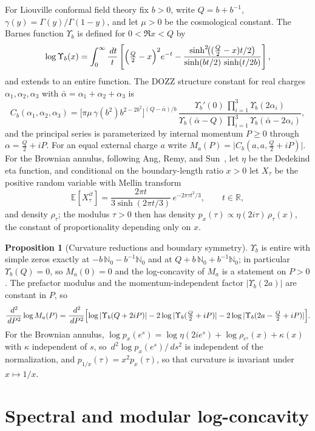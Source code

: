 \documentclass[11pt]{article}
\theoremstyle{definition}
\newcommand{\E}{\mathbb E}
\newcommand{\R}{\mathbb R}
\newcommand{\dd}{\,d}
\providecommand{\R}{\mathbb R}
\providecommand{\E}{\mathbb E}
\newtheorem{proposition}{Proposition}
\begin{document}
For Liouville conformal field theory fix $b>0$, write $Q=b+b^{-1}$, $\gamma(y)=\Gamma(y)/\Gamma(1-y)$, and let $\mu>0$ be the cosmological constant.  The Barnes function $\Upsilon_b$ is defined for $0<\Re x<Q$ by
\[
\log\Upsilon_b(x)=\int_0^\infty\frac{\dd t}{t}\left[\Bigl(\tfrac Q2-x\Bigr)^2e^{-t}-\frac{\sinh^2\!\bigl((\tfrac Q2-x)t/2\bigr)}{\sinh(bt/2)\,\sinh(t/2b)}\right],
\]
and extends to an entire function.  The DOZZ structure constant for real charges $\alpha_1,\alpha_2,\alpha_3$ with $\bar\alpha=\alpha_1+\alpha_2+\alpha_3$ is
\[
C_b(\alpha_1,\alpha_2,\alpha_3)=\bigl[\pi\mu\,\gamma(b^2)b^{2-2b^2}\bigr]^{(Q-\bar\alpha)/b}\,\frac{\Upsilon_b'(0)\,\prod_{i=1}^3\Upsilon_b(2\alpha_i)}{\Upsilon_b(\bar\alpha-Q)\,\prod_{i=1}^3\Upsilon_b(\bar\alpha-2\alpha_i)},
\]
and the principal series is parameterized by internal momentum $P\ge0$ through $\alpha=\tfrac Q2+iP$.  For an equal external charge $a$ write $M_a(P)=\bigl|C_b(a,a,\tfrac Q2+iP)\bigr|$.  For the Brownian annulus, following Ang, Remy, and Sun~\cite{ARS22}, let $\eta$ be the Dedekind eta function, and conditional on the boundary-length ratio $x>0$ let $X_\tau$ be the positive random variable with Mellin transform
\[
\E[X_\tau^{it}]=\frac{2\pi t}{3\sinh(2\pi t/3)}\,e^{-2\pi\tau t^2/3},\qquad t\in\R,
\]
and density $\rho_\tau$; the modulus $\tau>0$ then has density $p_x(\tau)\propto\eta(2i\tau)\,\rho_\tau(x)$, the constant of proportionality depending only on $x$.

\begin{proposition}[Curvature reductions and boundary symmetry]\label{ak:basic}
$\Upsilon_b$ is entire with simple zeros exactly at $-b\,\mathbb N_0-b^{-1}\mathbb N_0$ and at $Q+b\,\mathbb N_0+b^{-1}\mathbb N_0$; in particular $\Upsilon_b(Q)=0$, so $M_a(0)=0$ and the log-concavity of $M_a$ is a statement on $P>0$.  The prefactor modulus and the momentum-independent factor $|\Upsilon_b(2a)|$ are constant in $P$, so
\[
\frac{\dd^2}{\dd P^2}\log M_a(P)=\frac{\dd^2}{\dd P^2}\Bigl[\log|\Upsilon_b(Q+2iP)|-2\log|\Upsilon_b(\tfrac Q2+iP)|-2\log|\Upsilon_b(2a-\tfrac Q2+iP)|\Bigr].
\]
For the Brownian annulus, $\log p_x(e^s)=\log\eta(2ie^s)+\log\rho_{e^s}(x)+\kappa(x)$ with $\kappa$ independent of $s$, so $\dd^2\!\log p_x(e^s)/\dd s^2$ is independent of the normalization, and $p_{1/x}(\tau)=x^2p_x(\tau)$, so that curvature is invariant under $x\mapsto1/x$.
\end{proposition}

\section{Spectral and modular log-concavity}
\end{document}
